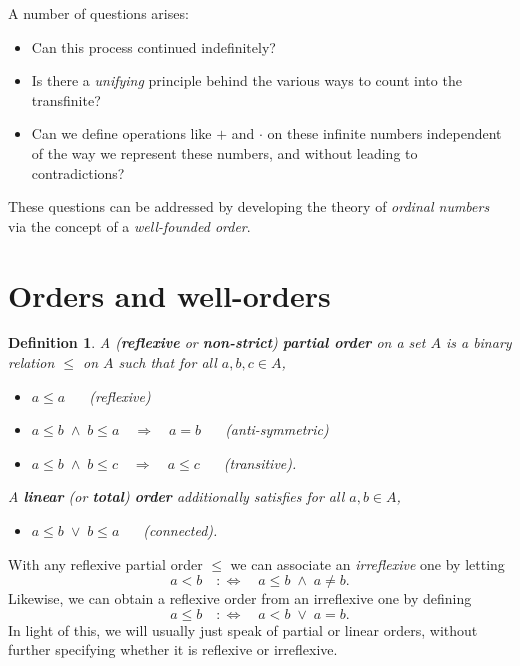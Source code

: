 \documentclass{article}
\newtheorem{definition}{Definition}[section]
\begin{document}
A number of questions arises:

\begin{itemize}
\item Can this process continued indefinitely?
\item Is there a \textit{unifying} principle behind the various ways to count into the transfinite?
\item Can we define operations like $+$ and $\cdot$ on these infinite numbers independent of the way we represent these numbers, and without leading to contradictions?
\end{itemize}

These questions can be addressed by developing the theory of \textit{ordinal numbers} via the concept of a \textit{well-founded order}.

\section{Orders and well-orders}

\begin{definition}A (\textbf{reflexive} or \textbf{non-strict}) \textbf{partial order} on a set $A$ is a binary relation $\leq$ on $A$ such that for all $a,b,c \in A$,

\begin{itemize}
\item $a\leq a$   (reflexive)


\item $a \leq b \; \wedge \; b \leq a \quad \Rightarrow \quad a = b$   (anti-symmetric)


\item $a \leq b \; \wedge \; b \leq c \quad \Rightarrow \quad a \leq c$   (transitive).
\end{itemize}

A \textbf{linear} (or \textbf{total}) \textbf{order} additionally satisfies for all $a,b \in A$,

\begin{itemize}
\item $a \leq b \; \vee \; b \leq a$    (connected).
\end{itemize}

\end{definition}With any reflexive partial order $\leq$ we can associate an \textit{irreflexive} one by letting
\begin{equation}
a < b \quad :\iff \quad a \leq b \; \wedge \; a \neq b.
\end{equation}
Likewise, we can obtain a reflexive order from an irreflexive one by defining
\begin{equation}
a \leq b \quad :\iff \quad a < b \; \vee \; a = b.
\end{equation}
In light of this, we will usually just speak of partial or linear orders, without further specifying whether it is reflexive or irreflexive.
\end{document}
